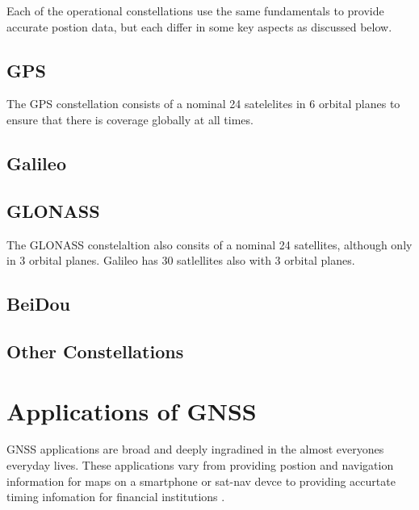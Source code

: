 Each of the operational constellations use the same fundamentals to provide accurate postion data, but each differ in some key aspects as discussed below.

\subsection{GPS}
The GPS constellation consists of a nominal 24 satelelites in 6 orbital planes to ensure that there is coverage globally at all times.  

\subsection{Galileo}

\subsection{GLONASS}
The GLONASS constelaltion also consits of a nominal 24 satellites, although only in 3 orbital planes. Galileo has 30 satlellites also with 3 orbital planes.

\subsection{BeiDou}

\subsection{Other Constellations}

\section{Applications of GNSS}
GNSS applications are broad and deeply ingradined in the almost everyones everyday lives. These applications vary from providing postion and navigation information for
maps on a smartphone or sat-nav devce to providing accurtate timing infomation for financial institutions \cite{RN33}. 